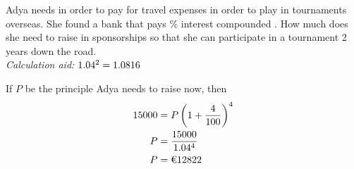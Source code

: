 
\watchout

\question[3]  Adya needs \texteuro{\vbone} in order to pay for travel expenses in order to 
play in tournaments overseas. She found a bank that pays \vbtwo\% interest compounded \vbfour. 
How much does she need to raise in sponsorships so that she can participate in a 
tournament 2 years down the road.\\
\textit{Calculation aid: $1.04^2=1.0816$}


\ifprintanswers
 
\fi 

\begin{solution}[\halfpage]
  If $P$ be the principle Adya needs to raise now, then 
  \begin{align}
    \vbone &= P\left(1+\dfrac{\vbtwo}{100}\right)^{\vbfive} \\
    P      &= \dfrac{\vbone}{\vbthree ^ \vbfive} \\
    P      &= \text{\texteuro{\vbseven}}
  \end{align}
\end{solution}

